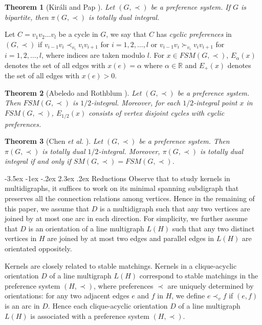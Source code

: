 \documentclass[11pt]{article}
\makeatletter
\newtheorem{theorem}{Theorem}%
\numberwithin{theorem}{section}
\renewcommand\section{%
  \@startsection{section}{1}
                {\z@}%
                {-3.5ex \@plus -1ex \@minus -.2ex}%
                {2.3ex \@plus.2ex}%
                {\large\bfseries}%
}
\makeatother
\begin{document}
\begin{theorem}[Kir\'{a}li and Pap \cite{KiraPap08}]
\label{thm:KiraPap08}
Let $(G,\prec)$ be a preference system. If $G$ is bipartite, then $\pi(G,\prec)$ is totally dual integral.
\end{theorem}

Let $C=v_1 v_2 \ldots v_l$ be a cycle in $G$, we say that $C$ has \textit{cyclic preferences} in $(G,\prec)$ if
$v_{i-1} v_i \prec_{v_i} v_i v_{i+1}$ for $i=1,2,\ldots,l$
or $v_{i-1} v_i\succ_{v_i} v_i v_{i+1}$ for $i=1,2,\ldots,l$,
where indices are taken modulo $l$.
For $x\in FSM(G,\prec)$, $E_{\alpha}(x)$ denotes the set of all edges with $x(e)=\alpha$ where $\alpha\in\mathbb{R}$ and $E_+(x)$ denotes the set of all edges with $x(e)>0$.

\begin{theorem}[Abeledo and Rothblum \cite{AbelRoth94}]
\label{thm:AbelRoth94}
Let $(G,\prec)$ be a preference system. Then $FSM(G,\prec)$ is $1/2$-integral. Moreover, for each $1/2$-integral point $x$ in $FSM(G,\prec)$, $E_{1/2}(x)$ consists of vertex disjoint cycles with cyclic preferences.
\end{theorem} 

\begin{theorem}[Chen \textit{et al.} \cite{ChenDing12}]
\label{thm:ChenDing12}
Let $(G,\prec)$ be a preference system. Then $\pi(G,\prec)$ is totally dual $1/2$-integral. Moreover, $\pi(G,\prec)$ is totally dual integral if and only if $SM(G,\prec)=FSM(G,\prec)$.
\end{theorem}

\section{Reductions}
Observe that to study kernels in multidigraphs, it suffices to work on its minimal spanning subdigraph that  preserves all the connection relations among vertices. Hence in the remaining of this paper, we assume that $D$ is a multidigraph such that any two vertices are joined by at most one arc in each direction. For simplicity, we further assume that $D$ is an orientation of a line multigraph $L(H)$ such that any two distinct vertices in $H$ are joined by at most two edges and parallel edges in $L(H)$ are orientated oppositely.

Kernels are closely related to stable matchings. Kernels in a clique-acyclic orientation $D$ of a line multigraph $L(H)$ correspond to stable matchings in the preference system $(H,\prec)$, where preferences $\prec$ are uniquely determined by orientations: for any two adjacent edges $e$ and $f$ in $H$, we define $e\prec_v f$ if $(e,f)$ is an arc in $D$. 
Hence each clique-acyclic orientation $D$ of a line multigraph $L(H)$ is associated with a preference system $(H,\prec)$.
\end{document}
